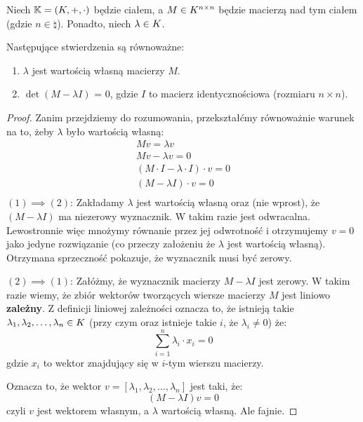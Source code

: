 \begin{theorem}
	Niech \(\mathbb{K} = (K, +, \cdot)\) będzie ciałem, a \(M \in K^{n \times n}\) będzie macierzą nad tym ciałem (gdzie \(n \in \natural\)). Ponadto, niech \(\lambda \in K\).

	Następujące stwierdzenia są równoważne:
	\begin{enumerate}
		\item \(\lambda\) jest wartością własną macierzy \(M\).
		\item \(\det{(M - \lambda I)}\) = 0, gdzie \(I\) to macierz identycznościowa (rozmiaru \(n \times n\)).
	\end{enumerate}
\end{theorem}
\begin{proof}
	Zanim przejdziemy do rozumowania, przekształćmy równoważnie warunek na to, żeby \(\lambda\) było wartością własną:
	\begin{align*}
		Mv = \lambda v                            \\
		Mv - \lambda v = 0                        \\
		(M \cdot I - \lambda \cdot I) \cdot v = 0 \\
		(M - \lambda I) \cdot v = 0               \\
	\end{align*}
	\( (1) \implies (2) \):
	Zakładamy \(\lambda\) jest wartością własną oraz (nie wprost), że \((M - \lambda I)\) ma niezerowy wyznacznik. W takim razie jest odwracalna. Lewostronnie więc mnożymy równanie przez jej odwrotność i otrzymujemy \(v = 0\) jako jedyne rozwiązanie (co przeczy założeniu że \(\lambda\) jest wartością własną). Otrzymana sprzeczność pokazuje, że wyznacznik musi być zerowy.

	\( (2) \implies (1) \):
	Załóżmy, że wyznacznik macierzy \(M - \lambda I\) jest zerowy. W takim razie wiemy, że zbiór wektorów tworzących wiersze macierzy \(M\) jest liniowo \textbf{zależny}. Z definicji liniowej zależności oznacza to, że istnieją takie \(\lambda_1, \lambda_2, \dots, \lambda_n \in K\) (przy czym oraz istnieje takie \(i\), że \(\lambda_i \not = 0\)) że:
	\[
		\sum_{i=1}^{n} \lambda_i \cdot x_i = 0
	\]
	gdzie \(x_i\) to wektor znajdujący się w \(i\)-tym wierszu macierzy.

	Oznacza to, że wektor \(v = [\lambda_1, \lambda_2, \dots, \lambda_n]\) jest taki, że:
	\[
		(M - \lambda I ) v = 0
	\]
	czyli \(v\) jest wektorem własnym, a \(\lambda\) wartością własną. Ale fajnie.

\end{proof}

